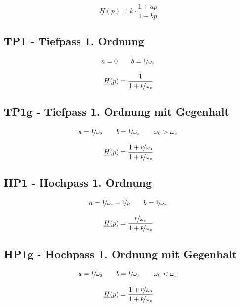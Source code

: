 \documentclass[a4paper, 12pt]{report}
\begin{document}
	\begin{large}
		\[ \underline{H}(p) = k \cdot \frac{1 + ap}{1 + bp} \]
	\end{large}
	
	\vspace{-0.5cm}
	
	\subsection*{TP1 - Tiefpass 1. Ordnung}
		\begin{minipage}[t]{0.5\textwidth}
			\[ a = 0 \qquad b = \nicefrac{1}{\omega_x} \]
		\end{minipage}
		\begin{minipage}[t]{0.5\textwidth}
			\[ \underline{H}(p) = \frac{1}{1 + \nicefrac{p}{\omega_x}} \]
		\end{minipage}
	
	\subsection*{TP1g - Tiefpass 1. Ordnung mit Gegenhalt}
		\begin{minipage}[t]{0.5\textwidth}
			\[ a = \nicefrac{1}{\omega_0} \qquad b = \nicefrac{1}{\omega_x} \qquad \omega_0 > \omega_x \]
		\end{minipage}
		\begin{minipage}[t]{0.5\textwidth}
			\[ \underline{H}(p) = \frac{1 + \nicefrac{p}{\omega_0}}{1 + \nicefrac{p}{\omega_x}} \]
		\end{minipage}
	
	\subsection*{HP1 - Hochpass 1. Ordnung}
		\begin{minipage}[t]{0.5\textwidth}
			\[ a = \nicefrac{1}{\omega_x} - \nicefrac{1}{p} \qquad b = \nicefrac{1}{\omega_x} \]
		\end{minipage}
		\begin{minipage}[t]{0.5\textwidth}
			\[ \underline{H}(p) = \frac{\nicefrac{p}{\omega_x}}{1 + \nicefrac{p}{\omega_x}} \]
		\end{minipage}
	
	\subsection*{HP1g - Hochpass 1. Ordnung mit Gegenhalt}
		\begin{minipage}[t]{0.5\textwidth}
			\[ a = \nicefrac{1}{\omega_0} \qquad b = \nicefrac{1}{\omega_x} \qquad \omega_0 < \omega_x \]
		\end{minipage}
		\begin{minipage}[t]{0.5\textwidth}
			\[ \underline{H}(p) = \frac{1 + \nicefrac{p}{\omega_0}}{1 + \nicefrac{p}{\omega_x}} \]
		\end{minipage}
	
\end{document}
